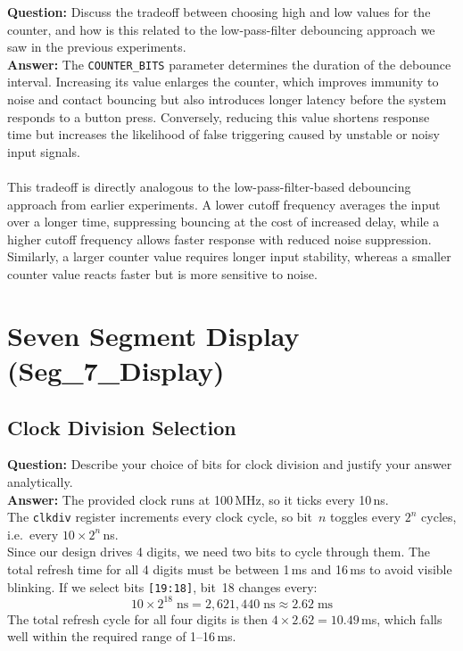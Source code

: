 \documentclass[12pt]{article}
\begin{document}
\noindent \textbf{Question:} Discuss the tradeoff between choosing high and low values for the counter, and how is this related to the low-pass-filter debouncing approach we saw in the previous experiments.\\
 
\noindent \textbf{Answer:}
The \texttt{COUNTER\_BITS} parameter determines the duration of the debounce interval. Increasing its value enlarges the counter, which improves immunity to noise and contact bouncing but also introduces longer latency before the system responds to a button press. Conversely, reducing this value shortens response time but increases the likelihood of false triggering caused by unstable or noisy input signals.\\\\This tradeoff is directly analogous to the low-pass-filter-based debouncing approach from earlier experiments. A lower cutoff frequency averages the input over a longer time, suppressing bouncing at the cost of increased delay, while a higher cutoff frequency allows faster response with reduced noise suppression. Similarly, a larger counter value requires longer input stability, whereas a smaller counter value reacts faster but is more sensitive to noise.
 
\newpage

\section{Seven Segment Display (Seg\_7\_Display)}
 
\subsection{Clock Division Selection}
 
\noindent \textbf{Question:} Describe your choice of bits for clock division and justify your answer analytically.\\
 
\noindent \textbf{Answer:}
The provided clock runs at 100\,MHz, so it ticks every 10\,ns.\\
The \texttt{clkdiv} register increments every clock cycle, so bit~$n$ toggles every $2^n$ cycles, i.e.\ every $10 \times 2^{n}$\,ns.\\
Since our design drives 4 digits, we need two bits to cycle through them. The total refresh time for all 4 digits must be between 1\,ms and 16\,ms to avoid visible blinking. If we select bits \texttt{[19:18]}, bit~18 changes every:
\[
10 \times 2^{18}\;\text{ns} = 2{,}621{,}440\;\text{ns} \approx 2.62\;\text{ms}
\]
The total refresh cycle for all four digits is then $4 \times 2.62 = 10.49$\,ms, which falls well within the required range of 1--16\,ms.
\end{document}
